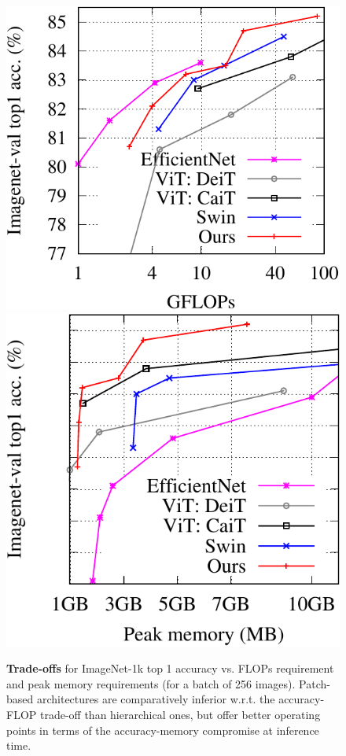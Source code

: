 \begin{figure}[t]
     \includegraphics[height=0.5\linewidth,clip,trim=0 0 0 0pt]{figs/acc_vs_flops.pdf}\hfill
     \includegraphics[height=0.5\linewidth,clip,trim=35 0 0 0pt]{figs/acc_vs_memory.pdf}
    \caption{\textbf{Trade-offs} for ImageNet-1k top 1 accuracy vs. FLOPs requirement and peak memory requirements (for a batch of 256 images). %
    Patch-based architectures are comparatively inferior w.r.t. the accuracy-FLOP trade-off than hierarchical ones, but offer better operating points in terms of the accuracy-memory compromise at inference time. 
    \label{fig:acc_flops_memory}}
\end{figure}



